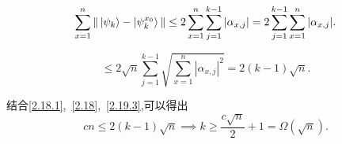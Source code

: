 \begin{equation*}
\sum_{x=1}^n \|\ket{\psi_k} - \ket{\psi_{k}^{x_0}}\| \leq 2 \sum_{x=1}^n \sum_{j=1}^{k-1} |\alpha_{x,j}| = 2 \sum_{j=1}^{k-1} \sum_{x=1}^n |\alpha_{x,j}|.
\end{equation*}

\begin{equation}\label{2.19.3}
 \leq 2 \sqrt{n} \sum_{j=1}^{k-1} \sqrt{\sum_{x=1}^n |\alpha_{x,j}|^2} = 2(k-1) \sqrt{n}.
\end{equation}

结合\cref{2.18.1},~\cref{2.18},~\cref{2.19.3},可以得出
\begin{equation}
cn \leq 2(k-1) \sqrt{n} \implies k \geq \frac{c \sqrt{n}}{2} + 1 = \Omega(\sqrt{n}).
\end{equation}



		